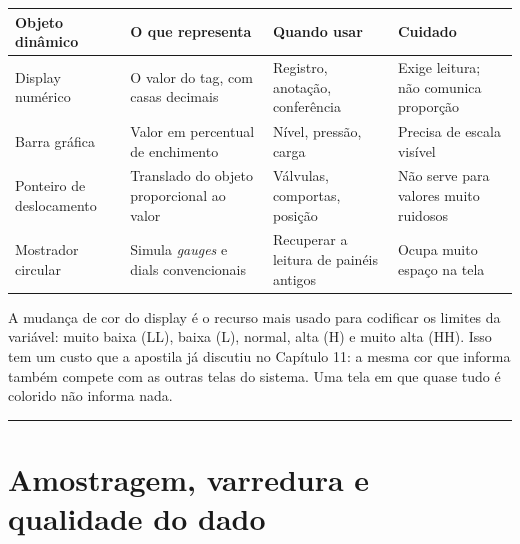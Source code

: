 \begin{longtable}[]{@{}
  >{\raggedright\arraybackslash}p{}
  >{\raggedright\arraybackslash}p{}
  >{\raggedright\arraybackslash}p{}
  >{\raggedright\arraybackslash}p{}@{}}
\toprule\noalign{}
\begin{minipage}[b]{\linewidth}\raggedright
Objeto dinâmico
\end{minipage} & \begin{minipage}[b]{\linewidth}\raggedright
O que representa
\end{minipage} & \begin{minipage}[b]{\linewidth}\raggedright
Quando usar
\end{minipage} & \begin{minipage}[b]{\linewidth}\raggedright
Cuidado
\end{minipage} \\
\midrule\noalign{}
\endhead
\bottomrule\noalign{}
\endlastfoot
Display numérico & O valor do tag, com casas decimais & Registro, anotação, conferência & Exige leitura; não comunica proporção \\
Barra gráfica & Valor em percentual de enchimento & Nível, pressão, carga & Precisa de escala visível \\
Ponteiro de deslocamento & Translado do objeto proporcional ao valor & Válvulas, comportas, posição & Não serve para valores muito ruidosos \\
Mostrador circular & Simula \emph{gauges} e dials convencionais & Recuperar a leitura de painéis antigos & Ocupa muito espaço na tela \\
\end{longtable}

A mudança de cor do display é o recurso mais usado para codificar os limites da variável: muito
baixa (LL), baixa (L), normal, alta (H) e muito alta (HH). Isso tem um custo que a apostila já
discutiu no Capítulo 11: a mesma cor que informa também compete com as outras telas do sistema. Uma
tela em que quase tudo é colorido não informa nada.

\begin{center}\rule{0.5\linewidth}{0.5pt}\end{center}

\section{Amostragem, varredura e qualidade do dado}\label{amostragem-varredura-e-qualidade-do-dado}

